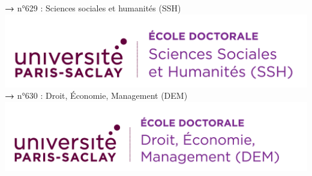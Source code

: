 \documentclass[english,12pt,a4paper]{book}
\begin{document}
\noindent \textbf{\color{Prune}→} n°629 : Sciences sociales et humanités (SSH)\\
\includegraphics[scale=.7]{logo_usp_SSH.png}\\

\noindent \textbf{\color{Prune}→} n°630 : Droit, Économie, Management (DEM)\\
\includegraphics[scale=.7]{logo_usp_DEM.png}\\
\end{document}
